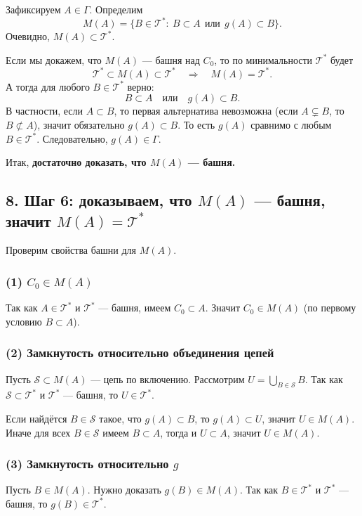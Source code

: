Зафиксируем $A\in\Gamma$. Определим
\[
    M(A)=\{B\in\mathcal T^{*}:\ B\subset A\ \ \text{или}\ \ g(A)\subset B\}.
\]
Очевидно, $M(A)\subset\mathcal T^{*}$.

\medskip

\noindent
Если мы докажем, что $M(A)$ --- башня над $C_0$, то по минимальности $\mathcal T^{*}$ будет
\[
    \mathcal T^{*}\subset M(A)\subset\mathcal T^{*}\quad\Rightarrow\quad M(A)=\mathcal T^{*}.
\]
А тогда для любого $B\in\mathcal T^{*}$ верно:
\[
    B\subset A\quad\text{или}\quad g(A)\subset B.
\]
В частности, если $A\subset B$, то первая альтернатива невозможна (если $A\subsetneq B$, то $B\not\subset A$),
значит обязательно $g(A)\subset B$. То есть $g(A)$ сравнимо с любым $B\in\mathcal T^{*}$.
Следовательно, $g(A)\in\Gamma$.

Итак, \textbf{достаточно доказать, что $M(A)$ --- башня.}

\subsection*{8. Шаг 6: доказываем, что $M(A)$ --- башня, значит $M(A)=\mathcal T^{*}$}

Проверим свойства башни для $M(A)$.

\subsubsection*{(1) $C_0\in M(A)$}
Так как $A\in\mathcal T^{*}$ и $\mathcal T^{*}$ --- башня, имеем $C_0\subset A$. Значит $C_0\in M(A)$
(по первому условию $B\subset A$).

\subsubsection*{(2) Замкнутость относительно объединения цепей}
Пусть $\mathcal S\subset M(A)$ --- цепь по включению. Рассмотрим $U=\bigcup_{B\in\mathcal S}B$.
Так как $\mathcal S\subset\mathcal T^{*}$ и $\mathcal T^{*}$ --- башня, то $U\in\mathcal T^{*}$.

Если найдётся $B\in\mathcal S$ такое, что $g(A)\subset B$, то $g(A)\subset U$, значит $U\in M(A)$.
Иначе для всех $B\in\mathcal S$ имеем $B\subset A$, тогда и $U\subset A$, значит $U\in M(A)$.

\subsubsection*{(3) Замкнутость относительно $g$}
Пусть $B\in M(A)$. Нужно доказать $g(B)\in M(A)$.
Так как $B\in\mathcal T^{*}$ и $\mathcal T^{*}$ --- башня, то $g(B)\in\mathcal T^{*}$.

